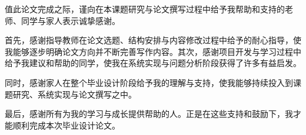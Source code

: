 
\begin{acknowledgements}
值此论文完成之际，谨向在本课题研究与论文撰写过程中给予我帮助和支持的老师、同学与家人表示诚挚感谢。

首先，感谢指导教师在论文选题、结构安排与内容修改过程中给予的耐心指导，使我能够逐步明确论文方向并不断完善写作内容。其次，感谢项目开发与学习过程中给予我建议和帮助的同学，使我在系统实现与问题分析阶段获得了许多有益启发。

同时，感谢家人在整个毕业设计阶段给予我的理解与支持，使我能够持续投入到课题研究、系统实现与论文撰写之中。

最后，感谢所有为我的学习与成长提供帮助的人。正是在这些支持和鼓励下，我才能顺利完成本次毕业设计论文。
\end{acknowledgements}
